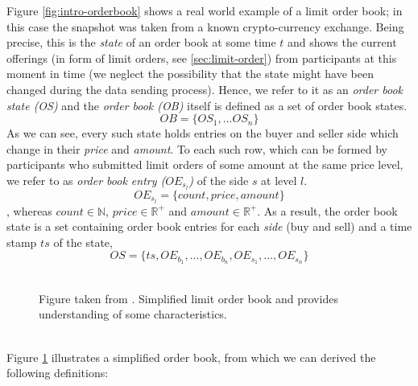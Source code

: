 Figure \ref{fig:intro-orderbook} shows a real world example of a limit order book; in this case the snapshot was taken from a known crypto-currency exchange.
Being precise, this is the \textit{state} of an order book at some time $t$ and shows the current offerings (in form of limit orders, see \ref{sec:limit-order}) from participants at this moment in time (we neglect the possibility that the state might have been changed during the data sending process). 
Hence, we refer to it as an \textit{order book state (OS)} and the \textit{order book (OB)} itself is defined as a set of order book states.
\begin{equation}\label{eq:order-book}
OB=\{OS_1, ... OS_n\}
\end{equation}
As we can see, every such state holds entries on the buyer and seller side which change in their \textit{price} and \textit{amount}.
To each such row, which can be formed by participants who submitted limit orders of some amount at the same price level, we refer to as \textit{order book entry ($OE_{s_l}$)} of the side $s$ at level $l$.
\begin{equation}
OE_{s_l}=\{count, price, amount\}
\end{equation}
, whereas $count \in \mathbb{N}$, $price \in \mathbb{R^+}$ and $amount \in \mathbb{R^+}$.
As a result, the order book state is a set containing order book entries for each \textit{side} (buy and sell) and a time stamp $ts$ of the state,
\begin{equation}\label{eq:order-book-state}
OS=\{ts, OE_{b_1}, ..., OE_{b_n}, OE_{s_1}, ..., OE_{s_n}\}
\end{equation}
\\
\begin{figure}[H]
    \centering
    \caption{Figure taken from \cite{miranda}. Simplified limit order book and provides understanding of some characteristics.}
    \label{fig:orderbook-simple}
\end{figure}
\hfill
\\
Figure \ref{fig:orderbook-simple} illustrates a simplified order book, from which we can derived the following definitions:

